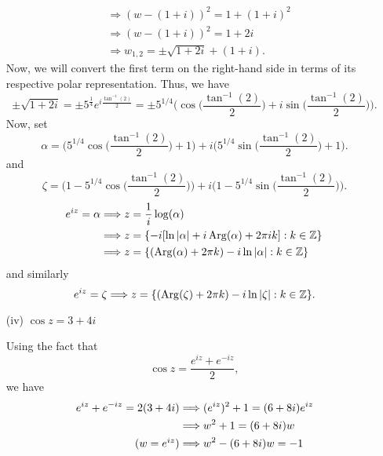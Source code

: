 \documentclass[a4paper]{article}
\begin{document}
\begin{enumerate}
\begin{solution}
\begin{align*}
                                                     &\Longrightarrow (w - (1+i))^{2} = 1 + (1+i)^{2} \\
                                                     &\Longrightarrow (w - (1+i))^{2 } = 1 + 2i \\
                                                     &\Longrightarrow  w_{1,2} = \pm \sqrt{ 1 + 2i } + (1+i). 
        \end{align*}
        Now, we will convert the first term on the right-hand side in terms of its respective polar representation. Thus, we have
        \[  \pm \sqrt{ 1 + 2i }  = \pm  5^{\frac{1  }{ 4 } } e^{i \frac{ \tan^{-1}(2) }{ 2 } } = \pm 5^{1/4} \Big(  \cos \Big(  \frac{ \tan^{-1}(2) }{ 2 }  \Big) + i \sin \Big(  \frac{ \tan^{-1}(2) }{ 2 }  \Big) \Big).  \]
        Now, set 
        \[  \alpha = \Big(  5^{1/4} \cos \Big(  \frac{ \tan^{-1}(2) }{ 2 }  \Big) + 1  \Big) + i \Big(  5^{1/4} \sin \Big(  \frac{ \tan^{-1}(2) }{ 2 }  \Big) + 1  \Big). \]
        and
        \[  \zeta = \Big(  1 - 5^{1/4} \cos \Big(  \frac{ \tan^{-1}(2) }{ 2 }  \Big)  \Big) + i \Big(  1 - 5^{1/4} \sin \Big(  \frac{ \tan^{-1}(2) }{ 2 }  \Big)  \Big). \]
        \begin{align*}
            e^{iz} = \alpha  &\Longrightarrow z = \frac{ 1 }{ i } \log (\alpha)  \\
                             &\Longrightarrow z = \{ -i [\ln | \alpha | + i \operatorname{Arg}(\alpha) + 2 \pi i k  ] : k \in \mathbb{Z} \} \\ 
                             &\Longrightarrow z = \{ (\operatorname{Arg}(\alpha) + 2 \pi  k) - i \ln | \alpha | : k \in \mathbb{Z}  \}
        \end{align*}
        and similarly
    \[  e^{iz} = \zeta \Longrightarrow z = \{  (\operatorname{Arg}(\zeta) + 2 \pi k) - i \ln | \zeta | : k \in \mathbb{Z}  \}.  \]
        \end{solution}
    \item[(iv)] \( \cos z = 3 + 4i \)
        \begin{solution}
        Using the fact that 
        \[  \cos z = \frac{ e^{iz} + e^{-iz} }{ 2 },  \]
        we have
        \begin{align*}
            e^{iz} + e^{-iz} = 2 (3 + 4i) &\Longrightarrow (e^{iz})^{2} + 1 = (6+8i) e^{iz}  \\
                                          &\Longrightarrow w^{2} + 1 = (6+8i)w \\ \tag{\( w = e^{iz} \)}
                                          &\Longrightarrow w^{2} - (6+8i)w = -1 \\

\end{align*}
\end{solution}
\end{enumerate}
\end{document}
